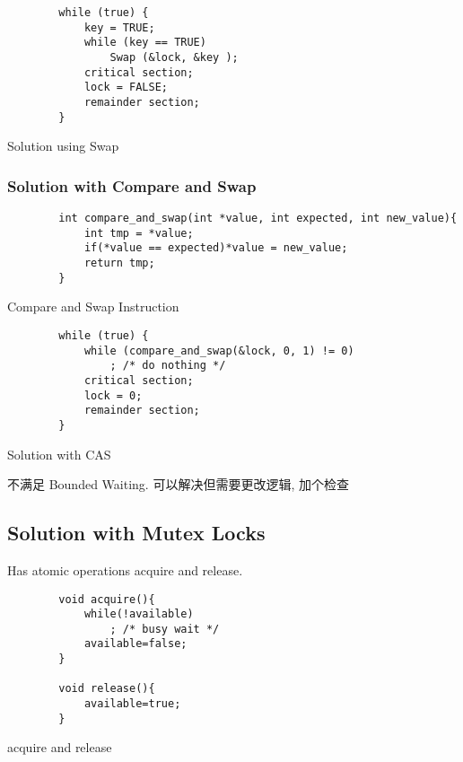 \begin{code}
    \begin{verbatim}
        while (true) {
            key = TRUE;
            while (key == TRUE)
                Swap (&lock, &key );
            critical section;
            lock = FALSE;
            remainder section;
        }
    \end{verbatim}
    \caption{Solution using Swap}
\end{code}

\subsubsection{Solution with Compare and Swap}
\begin{code}
    \begin{verbatim}
        int compare_and_swap(int *value, int expected, int new_value){
            int tmp = *value;
            if(*value == expected)*value = new_value;
            return tmp;
        }
    \end{verbatim}
    \caption{Compare and Swap Instruction}
\end{code}

\begin{code}
    \begin{verbatim}
        while (true) {
            while (compare_and_swap(&lock, 0, 1) != 0)  
                ; /* do nothing */
            critical section;
            lock = 0;
            remainder section;
        }
    \end{verbatim}
    \caption{Solution with CAS}
\end{code}

不满足 Bounded Waiting. 可以解决但需要更改逻辑, 加个检查

\subsection{Solution with Mutex Locks}
Has atomic operations acquire and release. 

\begin{code}
    \begin{verbatim}
        void acquire(){
            while(!available)
                ; /* busy wait */
            available=false;
        }

        void release(){
            available=true;
        }
    \end{verbatim}
    \caption{acquire and release}
\end{code}


